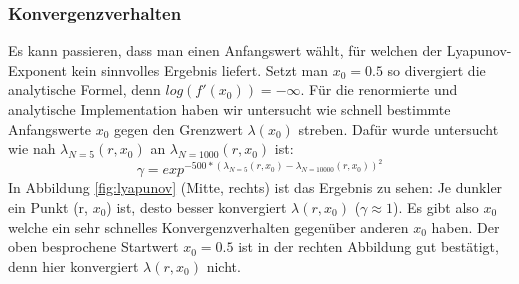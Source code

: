 \documentclass[11,5pt, twoside]{article}
\begin{document}
\subsubsection{Konvergenzverhalten}
Es kann passieren, dass man einen Anfangswert wählt, für welchen der Lyapunov-Exponent kein sinnvolles Ergebnis liefert. Setzt man $x_0=0.5$ so divergiert die analytische Formel, denn $log(f'(x_0))=-\infty$.
Für die renormierte und analytische Implementation haben wir untersucht wie schnell bestimmte Anfangswerte $x_0$ gegen den Grenzwert $\lambda(x_0)$ streben. Dafür wurde untersucht wie nah $\lambda_{N=5}(r, x_0)$ an $\lambda_{N=1000}(r, x_0)$ ist:
\begin{equation}
    \gamma = exp^{-500 * (\lambda_{N=5}(r,x_0)
    - \lambda_{N=10000}(r,x_0))^2}
\end{equation}
In Abbildung \ref{fig:lyapunov} (Mitte, rechts) ist das Ergebnis zu sehen: Je dunkler ein Punkt (r, $x_0$) ist, desto besser konvergiert $\lambda(r, x_0)$ ($\gamma \approx 1$). 
Es gibt also $x_0$ welche ein sehr schnelles Konvergenzverhalten gegenüber anderen $x_0$ haben. Der oben besprochene Startwert $x_0=0.5$ ist in der rechten Abbildung gut bestätigt, denn hier konvergiert $\lambda(r, x_0)$ nicht. 
\end{document}
